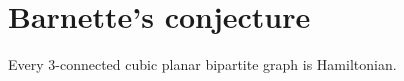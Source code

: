 \section{Barnette's conjecture}

\begin{conj}
  Every 3-connected cubic planar bipartite graph is Hamiltonian.
\end{conj}
